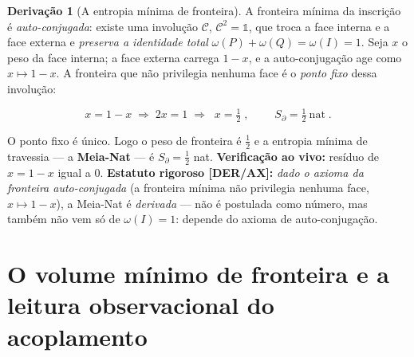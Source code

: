 \documentclass[11pt]{article}
\theoremstyle{definition}\newtheorem{deriv}{Derivação}
\begin{document}
\begin{deriv}[A entropia mínima de fronteira]

A fronteira mínima da inscrição é \emph{auto-conjugada}: existe uma involução $\mathcal{C}$, $\mathcal{C}^2=\mathbb{1}$, que troca a face interna e a face externa e \emph{preserva a identidade total} $\omega(P)+\omega(Q)=\omega(I)=1$. Seja $x$ o peso da face interna; a face externa carrega $1-x$, e a auto-conjugação age como $x\mapsto 1-x$. A fronteira que não privilegia nenhuma face é o \emph{ponto fixo} dessa involução:

\begin{equation}x=1-x\;\Longrightarrow\;2x=1\;\Longrightarrow\;\boxed{\;x=\tfrac12\;},\qquad\boxed{\;S_\partial=\tfrac12\ \text{nat}\;}.\end{equation}

O ponto fixo é único. Logo o peso de fronteira é $\tfrac12$ e a entropia mínima de travessia --- a \textbf{Meia-Nat} --- é $S_\partial=\tfrac12$ nat. \textbf{Verificação ao vivo:} resíduo de $x=1-x$ igual a $0$. \textbf{Estatuto rigoroso \textsf{[DER/AX]}:} \emph{dado o axioma da fronteira auto-conjugada} (a fronteira mínima não privilegia nenhuma face, $x\mapsto1-x$), a Meia-Nat é \emph{derivada} --- não é postulada como número, mas também não vem só de $\omega(I)=1$: depende do axioma de auto-conjugação.\end{deriv}

\section{O volume mínimo de fronteira e a leitura observacional do acoplamento}
\end{document}
